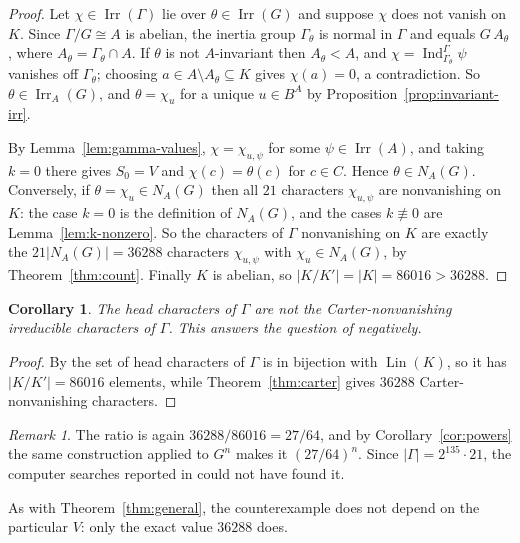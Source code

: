 \documentclass[11pt,a4paper,reqno]{amsart}
\newtheorem{corollary}[theorem]{Corollary}
\theoremstyle{definition}
\theoremstyle{remark}
\newtheorem{remark}[theorem]{Remark}
\newcommand{\Irr}{\operatorname{Irr}}
\newcommand{\Ind}{\operatorname{Ind}}
\begin{document}
\begin{proof}
Let $\chi\in\Irr(\Gamma)$ lie over $\theta\in\Irr(G)$ and suppose
$\chi$ does not vanish on $K$.  Since $\Gamma/G\cong A$ is abelian,
the inertia group $\Gamma_\theta$ is normal in $\Gamma$ and equals
$G\,A_\theta$, where $A_\theta=\Gamma_\theta\cap A$.  If $\theta$ is not
$A$-invariant then $A_\theta<A$, and $\chi=\Ind_{\Gamma_\theta}^\Gamma\psi$
vanishes off $\Gamma_\theta$; choosing $a\in A\setminus A_\theta\subseteq K$
gives $\chi(a)=0$, a contradiction.  So $\theta\in\Irr_A(G)$, and
$\theta=\chi_u$ for a unique $u\in B^A$ by
Proposition~\ref{prop:invariant-irr}.

By Lemma~\ref{lem:gamma-values}, $\chi=\chi_{u,\psi}$ for some
$\psi\in\Irr(A)$, and taking $k=0$ there gives $S_0=V$ and
$\chi(c)=\theta(c)$ for $c\in C$.  Hence $\theta\in N_A(G)$.
Conversely, if $\theta=\chi_u\in N_A(G)$ then all $21$ characters
$\chi_{u,\psi}$ are nonvanishing on $K$: the case $k=0$ is the
definition of $N_A(G)$, and the cases $k\not\equiv0$ are
Lemma~\ref{lem:k-nonzero}.  So the characters of $\Gamma$ nonvanishing
on $K$ are exactly the $21|N_A(G)|=36288$ characters $\chi_{u,\psi}$
with $\chi_u\in N_A(G)$, by Theorem~\ref{thm:count}.  Finally $K$ is
abelian, so $|K/K'|=|K|=86016>36288$.
\end{proof}

\begin{corollary}\label{cor:carter-head}
The head characters of $\Gamma$ are not the Carter-nonvanishing
irreducible characters of $\Gamma$.  This answers the question of
\cite[\S6]{isaacs-carter} negatively.
\end{corollary}

\begin{proof}
By \cite[Theorem A]{isaacs-carter} the set of head characters of
$\Gamma$ is in bijection with $\operatorname{Lin}(K)$, so it has
$|K/K'|=86016$ elements, while Theorem~\ref{thm:carter} gives $36288$
Carter-nonvanishing characters.
\end{proof}

\begin{remark}
The ratio is again $36288/86016=27/64$, and by
Corollary~\ref{cor:powers} the same construction applied to $G^n$ makes
it $(27/64)^n$.  Since $|\Gamma|=2^{135}\cdot21$, the computer searches
reported in \cite[\S6]{isaacs-carter} could not have found it.
\end{remark}

As with Theorem~\ref{thm:general}, the counterexample does not depend on
the particular $V$: only the exact value $36288$ does.
\end{document}
